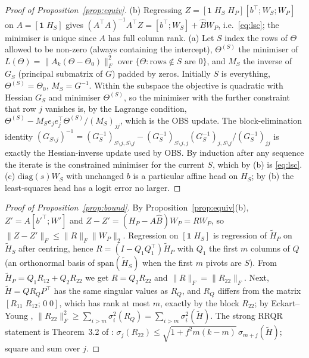 \documentclass[11pt,a4paper]{article}
\theoremstyle{remark}\newtheorem{remark}{Remark}
\begin{document}
\begin{proof}[Proof of Proposition~\ref{prop:equiv}]
(b) Regressing $Z=[\mathbf 1\;H_S\;H_P][b^\top;W_S;W_P]$ on $A=[\mathbf 1\;H_S]$ gives $(A^\top A)^{-1}A^\top Z=[b^\top;W_S]+\hat B W_P$, i.e.\ \eqref{eq:lsc}; the minimiser is unique since $A$ has full column rank.
(a) Let $S$ index the rows of $\Theta$ allowed to be non-zero (always containing the intercept), $\Theta^{(S)}$ the minimiser of $L(\Theta)=\|A_k(\Theta-\Theta_0)\|_F^2$ over $\{\Theta:\text{rows}\notin S\text{ are }0\}$, and $M_S$ the inverse of $G_S$ (principal submatrix of $G$) padded by zeros. Initially $S$ is everything, $\Theta^{(S)}=\Theta_0$, $M_S=G^{-1}$. Within the subspace the objective is quadratic with Hessian $G_S$ and minimiser $\Theta^{(S)}$, so the minimiser with the further constraint that row $j$ vanishes is, by the Lagrange condition, $\Theta^{(S)}-M_Se_je_j^\top\Theta^{(S)}/(M_S)_{jj}$, which is the OBS update. The block-elimination identity $(G_{S\setminus j})^{-1}=(G_S^{-1})_{S\setminus j,S\setminus j}-(G_S^{-1})_{S\setminus j,j}(G_S^{-1})_{j,S\setminus j}/(G_S^{-1})_{jj}$ is exactly the Hessian-inverse update used by OBS. By induction after any sequence the iterate is the constrained minimiser for the current $S$, which by (b) is \eqref{eq:lsc}.
(c) $\mathrm{diag}(s)W_S$ with unchanged $b$ is a particular affine head on $H_S$; by (b) the least-squares head has a logit error no larger.
\end{proof}

\begin{proof}[Proof of Proposition~\ref{prop:bound}]
By Proposition~\ref{prop:equiv}(b), $Z'=A[b'^\top;W']$ and $Z-Z'=(H_P-A\hat B)W_P=RW_P$, so $\|Z-Z'\|_F\le\|R\|_F\|W_P\|_2$. Regression on $[\mathbf 1\;H_S]$ is regression of $\tilde H_P$ on $\tilde H_S$ after centring, hence $R=(I-Q_1Q_1^\top)\tilde H_P$ with $Q_1$ the first $m$ columns of $Q$ (an orthonormal basis of $\mathrm{span}(\tilde H_S)$ when the first $m$ pivots are $S$). From $\tilde H_P=Q_1R_{12}+Q_2R_{22}$ we get $R=Q_2R_{22}$ and $\|R\|_F=\|R_{22}\|_F$. Next, $\tilde H=QR_QP^\top$ has the same singular values as $R_Q$, and $R_Q$ differs from the matrix $[R_{11}\;R_{12};\,0\;0]$, which has rank at most $m$, exactly by the block $R_{22}$; by Eckart--Young \cite{eckart1936}, $\|R_{22}\|_F^2\ge\sum_{i>m}\sigma_i^2(R_Q)=\sum_{i>m}\sigma_i^2(\tilde H)$. The strong RRQR statement is Theorem~3.2 of \cite{gu1996}: $\sigma_j(R_{22})\le\sqrt{1+f^2m(k-m)}\,\sigma_{m+j}(\tilde H)$; square and sum over $j$.
\end{proof}
\end{document}
